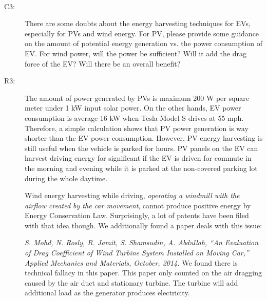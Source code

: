 \documentclass[onecolumn]{IEEEconf}
\begin{document}
\begin{description}

~\\

\item [C3: ] There are some doubts about the energy harvesting techniques for EVs, especially for PVs and wind energy. For PV, please provide some guidance on the amount of potential energy generation vs. the power consumption of EV. For wind power, will the power be sufficient? Will it add the drag force of the EV? Will there be an overall benefit?
\item [R3: ] The amount of power generated by PVs is maximum 200 W per square meter under 1 kW input solar power. On the other hands, EV power consumption is average 16 kW when Tesla Model S drives at 55 mph. Therefore, a simple calculation shows that PV power generation is way shorter than the EV power consumption. However, PV energy harvesting is still useful when the vehicle is parked for hours. PV panels on the EV can harvest  driving energy for significant if the EV is driven for commute in the morning and evening while it is parked at the non-covered parking lot during the whole daytime. 

Wind energy harvesting while driving, \textit{operating a windmill with the airflow created by the car movement}, cannot produce positive energy by Energy Conservation Law. Surprisingly, a lot of patents have been filed with that idea though. We additionally found a paper deals with this issue:

\textit{S. Mohd, N. Rosly, R. Jamit, S. Shamsudin, A. Abdullah, ``An Evaluation of Drag Coefficient of Wind Turbine System Installed on Moving Car,'' Applied Mechanics and Materials, October, 2014.} We found there is technical fallacy in this paper. This paper only counted on the air dragging caused by the air duct and stationary turbine. The turbine will add additional load as the generator produces electricity. 


\end{description}
\end{document}
